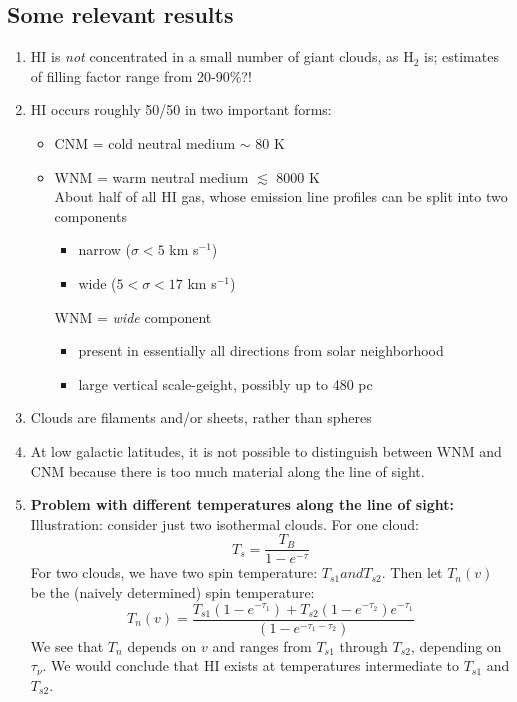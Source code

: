 \documentclass[11pt]{article}
\newcommand{\mar}[1]{\hspace{0pt}\marginpar{-\textcolor{black}{#1}-}}
\begin{document}
\subsection{Some relevant results}
\mar{47}
\begin{enumerate}
    \item HI is \emph{not} concentrated in a small number of giant clouds,
        as H$_{2}$ is; estimates of filling factor range from 20-90\%?!
    \item HI occurs roughly 50/50 in two important forms:
        \begin{itemize}[itemsep=0.5mm]
            \item CNM = cold neutral medium $\sim$ 80 K
            \item WNM = warm neutral medium $\lesssim$ 8000 K\\
                About half of all HI gas, whose emission line
                profiles can be split into two components
                \begin{itemize}
                    \item narrow ($\sigma < 5$ km s$^{-1}$)
                    \item wide ($5 < \sigma < 17$ km s$^{-1}$)
                \end{itemize}
                WNM = \emph{wide} component
                \begin{itemize}
                    \item present in essentially all directions from solar neighborhood
                    \item large vertical scale-geight, possibly up to 480 pc
                \end{itemize}
        \end{itemize}
    \item Clouds are filaments and/or sheets, rather than spheres
    \item At low galactic latitudes, it is not possible to distinguish between
        WNM and CNM because there is too much material along the line of sight.
    \item \textbf{Problem with different temperatures along the line of sight:}
        Illustration: consider just two isothermal clouds. For one cloud:
        \[
            T_{s} = \frac{T_{B}}{1 - e^{-\tau}}
            \]
        For two clouds, we have two spin temperature: $T_{s1} and T_{s2}$.
        \mar{48}Then let $T_{n}(v)$ be the (naively determined) spin
        temperature:
        \[
            T_{n}(v) = \frac
                { T_{s1} ( 1 - e^{-\tau_{1}}) + T_{s2} ( 1 - e^{-\tau_{2}})e^{-\tau_{1}} }
                { (1 - e^{-\tau_{1}-\tau_{2}}) }
            \]
        We see that $T_{n}$ depends on $v$ and ranges from $T_{s1}$ through
        $T_{s2}$, depending on $\tau_{\nu}$. We would conclude that HI exists at
        temperatures intermediate to $T_{s1}$ and $T_{s2}$.
\end{enumerate}
\end{document}
